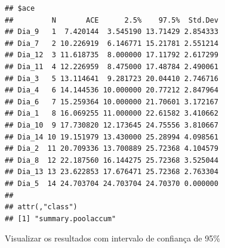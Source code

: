 \documentclass[
]{book}
\begin{document}
\begin{verbatim}
## $ace
##         N       ACE      2.5%    97.5%  Std.Dev
## Dia_9   1  7.420144  3.545190 13.71429 2.854333
## Dia_7   2 10.226919  6.146771 15.21781 2.551214
## Dia_12  3 11.618735  8.000000 17.11792 2.617299
## Dia_11  4 12.226959  8.475000 17.48784 2.490061
## Dia_3   5 13.114641  9.281723 20.04410 2.746716
## Dia_4   6 14.144536 10.000000 20.77212 2.847964
## Dia_6   7 15.259364 10.000000 21.70601 3.172167
## Dia_1   8 16.069255 11.000000 22.61582 3.410662
## Dia_10  9 17.730820 12.173645 24.75556 3.810667
## Dia_14 10 19.151979 13.430000 25.28994 4.098561
## Dia_2  11 20.709336 13.700889 25.72368 4.104579
## Dia_8  12 22.187560 16.144275 25.72368 3.525044
## Dia_13 13 23.622853 17.676471 25.72368 2.763304
## Dia_5  14 24.703704 24.703704 24.70370 0.000000
## 
## attr(,"class")
## [1] "summary.poolaccum"
\end{verbatim}

Visualizar os resultados com intervalo de confiança de 95\%
\end{document}

